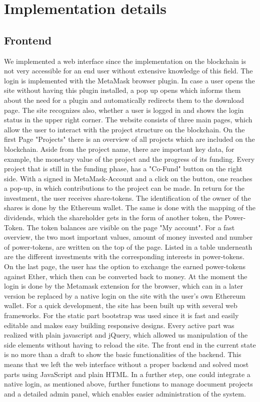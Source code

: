 \section{Implementation details}
\subsection{Frontend}
We implemented a web interface since the implementation on the blockchain is not very accessible for an end user without extensive knowledge of this field.
The login is implemented with the MetaMask browser plugin. In case a user opens the site without having this plugin installed, a pop up opens which informs them about the need for a plugin and automatically redirects them to the download page. The site recognizes also, whether a user is logged in and shows the login status in the upper right corner.
The website consists of three main pages, which allow the user to interact with the project structure on the blockchain. On the first Page "Projects" there is an overview of all projects which are included on the blockchain. Aside from the project name, there are important key data, for example, the monetary value of the project and the progress of its funding. Every project that is still in the funding phase, has a "Co-Fund" button on the right side. With a signed in MetaMask-Account and a click on the button, one reaches a pop-up, in which contributions to the project can be made. In return for the investment, the user receives share-tokens. The identification of the owner of the shares is done by the Ethereum wallet. The same is done with the mapping of the dividends, which the shareholder gets in the form of another token, the Power-Token. The token balances are visible on the page "My account". For a fast overview, the two most important values, amount of money invested and number of power-tokens, are written on the top of the page. Listed in a table underneath are the different investments with the corresponding interests in power-tokens. On the last page, the user has the option to exchange the earned power-tokens against Ether, which then can be converted back to money. 
At the moment the login is done by the Metamask extension for the browser, which can in a later version be replaced by a native login on the site with the user’s own Ethereum wallet. 
For a quick development, the site has been built up with several web frameworks. For the static part bootstrap was used since it is fast and easily editable and makes easy building responsive designs. Every active part was realized with plain javascript and jQuery, which allowed us manipulation of the side elements without having to reload the site.
The front end in the current state is no more than a draft to show the basic functionalities of the backend. This means that we left the web interface without a proper backend and solved most parts using JavaScript and plain HTML. In a further step, one could integrate a native login, as mentioned above, further functions to manage document projects and a detailed admin panel, which enables easier administration of the system.


